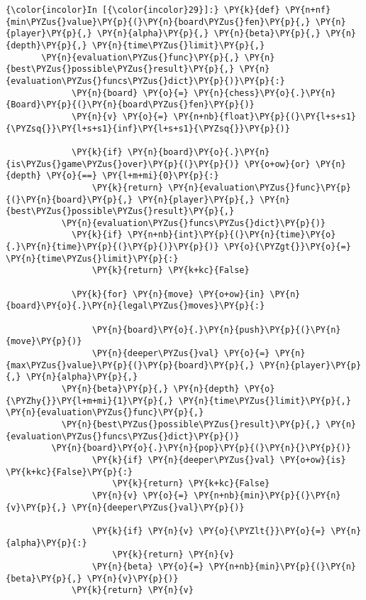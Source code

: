     \begin{Verbatim}[commandchars=\\\{\}]
{\color{incolor}In [{\color{incolor}29}]:} \PY{k}{def} \PY{n+nf}{min\PYZus{}value}\PY{p}{(}\PY{n}{board\PYZus{}fen}\PY{p}{,} \PY{n}{player}\PY{p}{,} \PY{n}{alpha}\PY{p}{,} \PY{n}{beta}\PY{p}{,} \PY{n}{depth}\PY{p}{,} \PY{n}{time\PYZus{}limit}\PY{p}{,} 
	   \PY{n}{evaluation\PYZus{}func}\PY{p}{,} \PY{n}{best\PYZus{}possible\PYZus{}result}\PY{p}{,} \PY{n}{evaluation\PYZus{}funcs\PYZus{}dict}\PY{p}{)}\PY{p}{:}
             \PY{n}{board} \PY{o}{=} \PY{n}{chess}\PY{o}{.}\PY{n}{Board}\PY{p}{(}\PY{n}{board\PYZus{}fen}\PY{p}{)}
             \PY{n}{v} \PY{o}{=} \PY{n+nb}{float}\PY{p}{(}\PY{l+s+s1}{\PYZsq{}}\PY{l+s+s1}{inf}\PY{l+s+s1}{\PYZsq{}}\PY{p}{)}
         
             \PY{k}{if} \PY{n}{board}\PY{o}{.}\PY{n}{is\PYZus{}game\PYZus{}over}\PY{p}{(}\PY{p}{)} \PY{o+ow}{or} \PY{n}{depth} \PY{o}{==} \PY{l+m+mi}{0}\PY{p}{:}
                 \PY{k}{return} \PY{n}{evaluation\PYZus{}func}\PY{p}{(}\PY{n}{board}\PY{p}{,} \PY{n}{player}\PY{p}{,} \PY{n}{best\PYZus{}possible\PYZus{}result}\PY{p}{,} 
		   \PY{n}{evaluation\PYZus{}funcs\PYZus{}dict}\PY{p}{)}
             \PY{k}{if} \PY{n+nb}{int}\PY{p}{(}\PY{n}{time}\PY{o}{.}\PY{n}{time}\PY{p}{(}\PY{p}{)}\PY{p}{)} \PY{o}{\PYZgt{}}\PY{o}{=} \PY{n}{time\PYZus{}limit}\PY{p}{:}
                 \PY{k}{return} \PY{k+kc}{False}
         
             \PY{k}{for} \PY{n}{move} \PY{o+ow}{in} \PY{n}{board}\PY{o}{.}\PY{n}{legal\PYZus{}moves}\PY{p}{:}

                 \PY{n}{board}\PY{o}{.}\PY{n}{push}\PY{p}{(}\PY{n}{move}\PY{p}{)}
                 \PY{n}{deeper\PYZus{}val} \PY{o}{=} \PY{n}{max\PYZus{}value}\PY{p}{(}\PY{p}{board}\PY{p}{,} \PY{n}{player}\PY{p}{,} \PY{n}{alpha}\PY{p}{,} 
		   \PY{n}{beta}\PY{p}{,} \PY{n}{depth} \PY{o}{\PYZhy{}}\PY{l+m+mi}{1}\PY{p}{,} \PY{n}{time\PYZus{}limit}\PY{p}{,} \PY{n}{evaluation\PYZus{}func}\PY{p}{,} 
		   \PY{n}{best\PYZus{}possible\PYZus{}result}\PY{p}{,} \PY{n}{evaluation\PYZus{}funcs\PYZus{}dict}\PY{p}{)}
		 \PY{n}{board}\PY{o}{.}\PY{n}{pop}\PY{p}{(}\PY{n}{}\PY{p}{)}
                 \PY{k}{if} \PY{n}{deeper\PYZus{}val} \PY{o+ow}{is} \PY{k+kc}{False}\PY{p}{:}
                     \PY{k}{return} \PY{k+kc}{False}            
                 \PY{n}{v} \PY{o}{=} \PY{n+nb}{min}\PY{p}{(}\PY{n}{v}\PY{p}{,} \PY{n}{deeper\PYZus{}val}\PY{p}{)}  
         
                 \PY{k}{if} \PY{n}{v} \PY{o}{\PYZlt{}}\PY{o}{=} \PY{n}{alpha}\PY{p}{:}
                     \PY{k}{return} \PY{n}{v}
                 \PY{n}{beta} \PY{o}{=} \PY{n+nb}{min}\PY{p}{(}\PY{n}{beta}\PY{p}{,} \PY{n}{v}\PY{p}{)}
             \PY{k}{return} \PY{n}{v}
\end{Verbatim}

